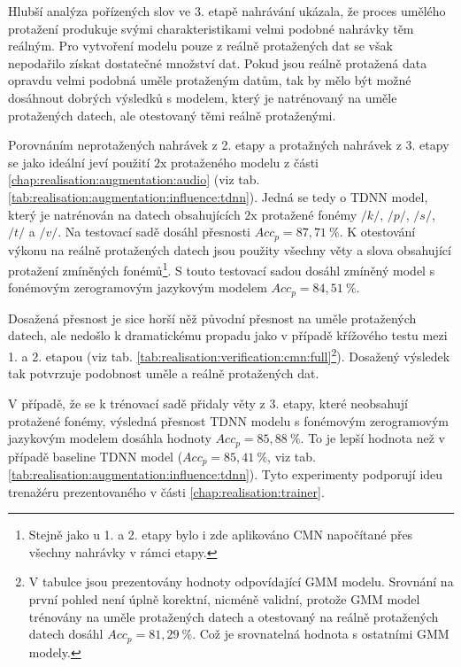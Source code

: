 Hlubší analýza pořízených slov ve 3. etapě nahrávání ukázala, že proces umělého protažení produkuje svými charakteristikami velmi podobné nahrávky těm reálným.
Pro vytvoření modelu pouze z reálně protažených dat se však nepodařilo získat dostatečné množství dat.
Pokud jsou reálně protažená data opravdu velmi podobná uměle protaženým datům, tak by mělo být možné dosáhnout dobrých výsledků s modelem, který je natrénovaný na uměle protažených datech, ale otestovaný těmi reálně protaženými.

Porovnáním neprotažených nahrávek z 2. etapy a protažných nahrávek z 3. etapy se jako ideální jeví použití $2\mathrm{x}$ protaženého modelu z části \ref{chap:realisation:augmentation:audio} (viz tab. \ref{tab:realisation:augmentation:influence:tdnn}).
Jedná se tedy o TDNN model, který je natrénován na datech obsahujících $2\mathrm{x}$ protažené fonémy $/k/$, $/p/$, $/s/$, $/t/$ a $/v/$.
Na testovací sadě dosáhl přesnosti $Acc_{p} = 87,71\ \%$.
K otestování výkonu na reálně protažených datech jsou použity všechny věty a slova obsahující protažení zmíněných fonémů\footnote{Stejně jako u 1. a 2. etapy bylo i zde aplikováno CMN napočítané přes všechny nahrávky v rámci etapy.}.
S touto testovací sadou dosáhl zmíněný model s fonémovým zerogramovým jazykovým modelem $Acc_{p} = 84,51\ \%$.

Dosažená přesnost je sice horší něž původní přesnost na uměle protažených datech, ale nedošlo k dramatickému propadu jako v případě křížového testu mezi 1. a 2. etapou (viz tab. \ref{tab:realisation:verification:cmn:full}\footnote{V tabulce jsou prezentovány hodnoty odpovídající GMM modelu. Srovnání na první pohled není úplně korektní, nicméně validní, protože GMM model trénovány na uměle protažených datech a otestovaný na reálně protažených datech dosáhl $Acc_{p} = 81,29\ \%$. Což je srovnatelná hodnota s ostatními GMM modely.}).
Dosažený výsledek tak potvrzuje podobnost uměle a reálně protažených dat.

V případě, že se k trénovací sadě přidaly věty z 3. etapy, které neobsahují protažené fonémy, výsledná přesnost TDNN modelu s fonémovým zerogramovým jazykovým modelem dosáhla hodnoty $Acc_{p} = 85,88\ \%$.
To je lepší hodnota než v případě baseline TDNN model ($Acc_{p} = 85,41\ \%$, viz tab. \ref{tab:realisation:augmentation:influence:tdnn}).
Tyto experimenty podporují ideu trenažéru prezentovaného v části \ref{chap:realisation:trainer}.
